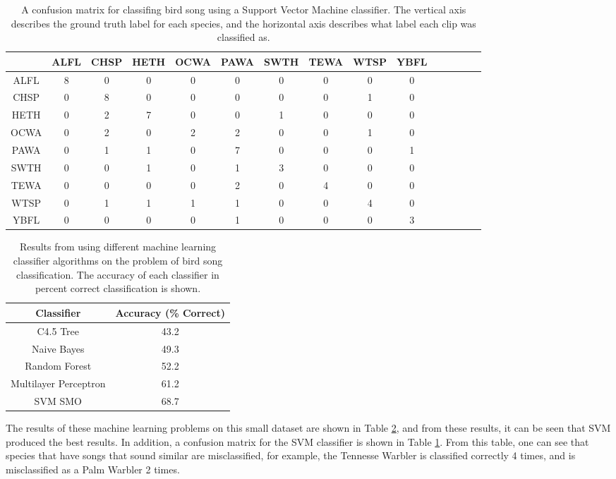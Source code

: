 \documentclass[12pt,oneside]{book}
\begin{document}
\begin{table}
\begin{tabular}{|c|c|c|c|c|c|c|c|c|c|c|c|c|c|c|}
\hline
& ALFL & CHSP & HETH & OCWA & PAWA & SWTH & TEWA & WTSP & YBFL \\ 
\hline
ALFL & 8 & 0 & 0 & 0 & 0 & 0 & 0 & 0 & 0 \\
CHSP & 0 & 8 & 0 & 0 & 0 & 0 & 0 & 1 & 0 \\
HETH & 0 & 2 & 7 & 0 & 0 & 1 & 0 & 0 & 0 \\
OCWA & 0 & 2 & 0 & 2 & 2 & 0 & 0 & 1 & 0 \\
PAWA & 0 & 1 & 1 & 0 & 7 & 0 & 0 & 0 & 1 \\
SWTH & 0 & 0 & 1 & 0 & 1 & 3 & 0 & 0 & 0 \\
TEWA & 0 & 0 & 0 & 0 & 2 & 0 & 4 & 0 & 0 \\
WTSP & 0 & 1 & 1 & 1 & 1 & 0 & 0 & 4 & 0 \\
YBFL & 0 & 0 & 0 & 0 & 1 & 0 & 0 & 0 & 3 \\

\hline
\end{tabular}
\caption{A confusion matrix for classifing bird song using a Support
  Vector Machine classifier.  The vertical axis describes the ground
  truth label for each species, and the horizontal axis describes what
  label each clip was classified as.}
\label{table:birdSongConfusion}
\end{table}



\begin{table}
\begin{tabular}{|c|c|}
\hline
Classifier     & Accuracy (\% Correct)    \\
\hline
C4.5 Tree             & 43.2              \\
Naive Bayes           & 49.3              \\
Random Forest         & 52.2              \\
Multilayer Perceptron & 61.2              \\
SVM SMO               & 68.7              \\
\hline
\end{tabular}
\caption{Results from using different machine learning classifier
  algorithms on the problem of bird song classification.  The accuracy
  of each classifier in percent correct classification is shown.}
\label{table:birdSongClassification}
\end{table}

The results of these machine learning problems on this small dataset
are shown in Table \ref{table:birdSongClassification}, and from these
results, it can be seen that SVM produced the best results.  In
addition, a confusion matrix for the SVM classifier is shown in Table
\ref{table:birdSongConfusion}.  From this table, one can see that
species that have songs that sound similar are misclassified, for
example, the Tennesse Warbler is classified correctly 4 times, and is
misclassified as a Palm Warbler 2 times.
\end{document}
